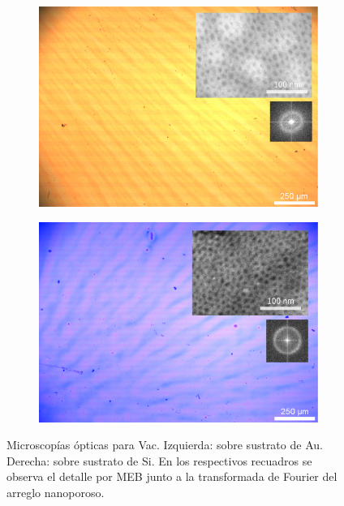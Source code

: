 		 \begin{figure}
	 	   	    \begin{subfigure}{0.495\textwidth}
		       	\includegraphics[width=\textwidth]{Imagenes/Au_130VF127-Combinada.jpg}
		   		\end{subfigure}
		   		\begin{subfigure}{0.495\textwidth}
		   	    \includegraphics[width=\textwidth]{Imagenes/Si_130VF127-Combinada.jpg}
		   		\end{subfigure}
				 \caption[Microscopía óptica \pdmF\space tratamiento vacío.]{Microscopías ópticas para Vac\pdmF. Izquierda: sobre sustrato de Au. Derecha: sobre sustrato de Si. En los respectivos recuadros se observa el detalle por MEB junto a la transformada de Fourier del arreglo nanoporoso.}
				 \label{fig:Microscopia_F127_vacio}	
			     \end{figure}	

